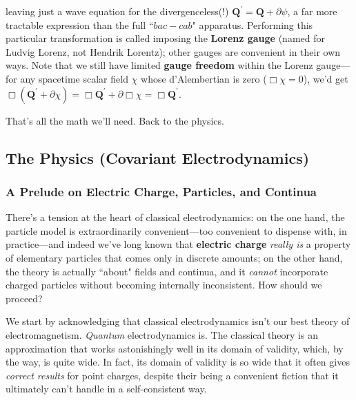 \documentclass[12pt]{article}
\renewcommand{\vv}[1]{\mathbf{#1}}
\begin{document}
leaving just a wave equation for the divergenceless(!) $\vv Q^\prime = \vv Q + \partialup \psi$, a far more tractable expression than the full ``$bac - cab$" apparatus. Performing this particular transformation is called imposing the \textbf{Lorenz gauge} (named for Ludvig Lorenz, not Hendrik Lorentz); other gauges are convenient in their own ways. Note that we still have limited \textbf{gauge freedom} within the Lorenz gauge---for any spacetime scalar field $\chi$ whose d'Alembertian is zero (${\Box \chi = 0}$), we'd get $\Box ( \vv Q^\prime + \partialup \chi ) = \Box \vv Q^\prime + \partialup \Box \chi = \Box \vv Q^\prime$.

That's all the math we'll need. Back to the physics.



\subsection{The Physics (Covariant Electrodynamics)}

\subsubsection{A Prelude on Electric Charge, Particles, and Continua}

There's a tension at the heart of classical electrodynamics: on the one hand, the particle model is extraordinarily convenient---too convenient to dispense with, in practice---and indeed we've long known that \textbf{electric charge} \emph{really is} a property of elementary particles that comes only in discrete amounts; on the other hand, the theory is actually ``about" fields and continua, and it \emph{cannot} incorporate charged particles without becoming internally inconsistent. How should we proceed?

We start by acknowledging that classical electrodynamics isn't our best theory of electromagnetism. \emph{Quantum} electrodynamics is. The classical theory is an approximation that works astonishingly well in its domain of validity, which, by the way, is quite wide. In fact, its domain of validity is so wide that it often gives \emph{correct results} for point charges, despite their being a convenient fiction that it ultimately can't handle in a self-consistent way.
\end{document}
